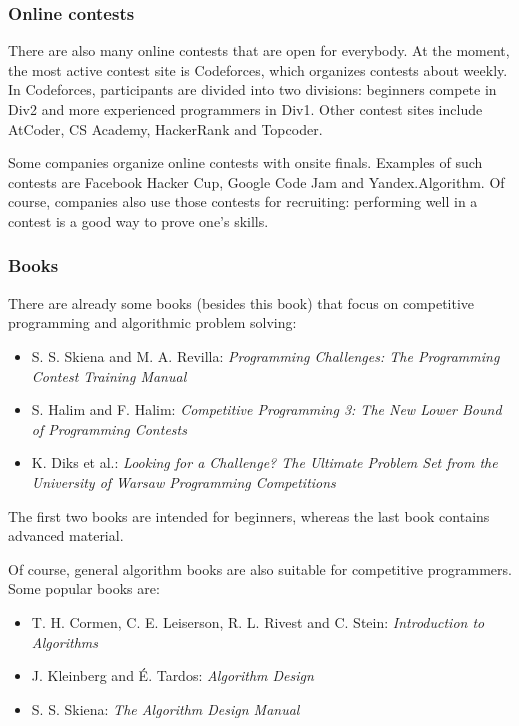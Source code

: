 \subsubsection{Online contests}

There are also many online contests that are open for everybody.
At the moment, the most active contest site is Codeforces,
which organizes contests about weekly.
In Codeforces, participants are divided into two divisions:
beginners compete in Div2 and more experienced programmers in Div1.
Other contest sites include AtCoder, CS Academy, HackerRank and Topcoder.

Some companies organize online contests with onsite finals.
Examples of such contests are Facebook Hacker Cup,
Google Code Jam and Yandex.Algorithm.
Of course, companies also use those contests for recruiting:
performing well in a contest is a good way to prove one's skills.

\subsubsection{Books}

There are already some books (besides this book) that
focus on competitive programming and algorithmic problem solving:

\begin{itemize}
\item S. S. Skiena and M. A. Revilla:
\emph{Programming Challenges: The Programming Contest Training Manual} \cite{ski03}
\item S. Halim and F. Halim:
\emph{Competitive Programming 3: The New Lower Bound of Programming Contests} \cite{hal13}
\item K. Diks et al.: \emph{Looking for a Challenge? The Ultimate Problem Set from
the University of Warsaw Programming Competitions} \cite{dik12}
\end{itemize}

The first two books are intended for beginners,
whereas the last book contains advanced material.

Of course, general algorithm books are also suitable for
competitive programmers.
Some popular books are:

\begin{itemize}
\item T. H. Cormen, C. E. Leiserson, R. L. Rivest and C. Stein:
\emph{Introduction to Algorithms} \cite{cor09}
\item J. Kleinberg and É. Tardos:
\emph{Algorithm Design} \cite{kle05}
\item S. S. Skiena:
\emph{The Algorithm Design Manual} \cite{ski08}
\end{itemize}

